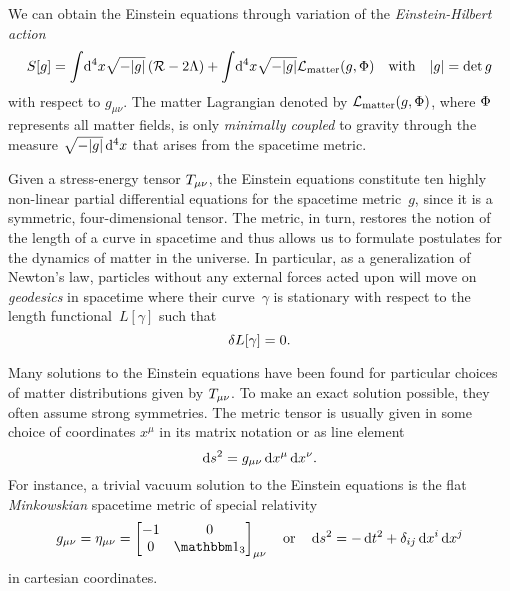 We can obtain the Einstein equations through variation of the \emph{Einstein-Hilbert action}
\begin{align}\label{eq:einstein_hilbert_action}%
	S[g] = \int \! \dif{^4x} \sqrt{-\metrdet{g}} \del{\Rscal - 2\cosmconst} + \int \! \dif{^4x} \sqrt{-\metrdet{g}} \lagrdensmatter \quad \text{with} \quad \metrdet{g} = \det{g}
\end{align}
with respect to \(g_{\mu \nu}\). The matter Lagrangian denoted by \(\mathcal{L}_\textnormal{matter}(g,\Phi)\), where \(\Phi\) represents all matter fields, is only \emph{minimally coupled} to gravity through the measure \(\sqrt{-\metrdet{g}}\dif{^4x}\) that arises from the spacetime metric.

Given a stress-energy tensor \(T_{\mu \nu}\), the Einstein equations constitute ten highly non-linear partial differential equations for the spacetime metric~\(g\), since it is a symmetric, four-dimensional tensor. The metric, in turn, restores the notion of the length of a curve in spacetime and thus allows us to formulate postulates for the dynamics of matter in the universe. In particular, as a generalization of Newton's law, particles without any external forces acted upon will move on \emph{geodesics} in spacetime where their curve~\(\gamma\) is stationary with respect to the length functional~\(L[\gamma]\) such that
\begin{equation}
	\delta L[\gamma] = 0
	\mathpunct{.}
\end{equation}

Many solutions to the Einstein equations have been found for particular choices of matter distributions given by \(T_{\mu\nu}\). To make an exact solution possible, they often assume strong symmetries. The metric tensor is usually given in some choice of coordinates \(x^\mu\) in its matrix notation or as line element
\begin{equation}
	\dif{s}^2 = g_{\mu \nu}\dif{x}^\mu \dif{x}^\nu
	\eqpunct{.}
\end{equation}
For instance, a trivial vacuum solution to the Einstein equations is the flat \emph{Minkowskian} spacetime metric of special relativity
\begin{equation}
	g_{\mu \nu} = \eta_{\mu \nu} =
	\begin{bmatrix}
		-1 & 0 \\
		0 & \idmat_3
	\end{bmatrix}_{\mu \nu} \quad \text{or} \quad \dif{s}^2 = -\dif{t}^2 + \delta_{ij} \dif{x}^i \dif{x}^j
\end{equation}
in cartesian coordinates. 


